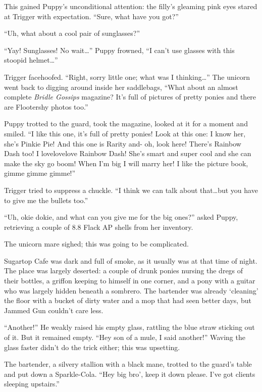 This gained Puppy's unconditional attention: the filly's gleaming pink eyes stared at Trigger with expectation. ``Sure, what have you got?''

``Uh, what about a cool pair of sunglasses?''

``Yay! Sunglasses! No wait\dots'' Puppy frowned, ``I can't use glasses with this stoopid helmet\dots''

Trigger facehoofed. ``Right, sorry little one; what was I thinking\dots '' The unicorn went back to digging around inside her saddlebags, ``What about an almost complete \emph{Bridle Gossips} magazine? It's full of pictures of pretty ponies and there are Flootershy photos too.''

Puppy trotted to the guard, took the magazine, looked at it for a moment and smiled. ``I like this one, it's full of pretty ponies! Look at this one: I know her, she's Pinkie Pie! And this one is Rarity and- oh, look here! There's Rainbow Dash too! I lovelovelove Rainbow Dash! She's smart and super cool and she can make the sky go boom! When I'm big I will marry her! I like the picture book, gimme gimme gimme!''

Trigger tried to suppress a chuckle. ``I think we can talk about that\dots but you have to give me the bullets too.''

``Uh, okie dokie, and what can you give me for the big ones?'' asked Puppy, retrieving a couple of 8.8 Flack AP shells from her inventory.

The unicorn mare sighed; this was going to be complicated.

\horizonline


Sugartop Cafe was dark and full of smoke, as it usually was at that time of night. The place was largely deserted: a couple of drunk ponies nursing the dregs of their bottles, a griffon keeping to himself in one corner, and a pony with a guitar who was largely hidden beneath a sombrero. The bartender was already `cleaning' the floor with a bucket of dirty water and a mop that had seen better days, but Jammed Gun couldn't care less.

``Another!'' He weakly raised his empty glass, rattling the blue straw sticking out of it. But it remained empty. ``Hey son of a mule, I said another!'' Waving the glass faster didn't do the trick either; this was upsetting.

The bartender, a silvery stallion with a black mane, trotted to the guard's table and put down a Sparkle-Cola. ``Hey big bro', keep it down please. I've got clients sleeping upstairs.''

